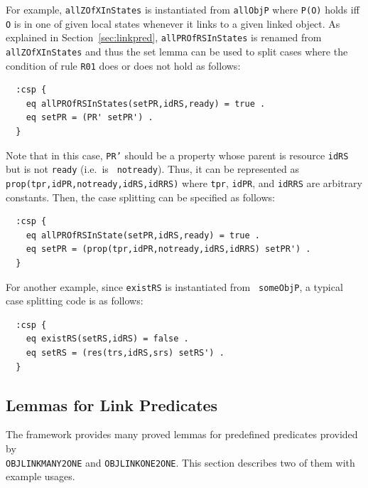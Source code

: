 \documentclass[12pt]{report}
\newcommand{\stt}[1]{{\small{\tt {#1}}}}
\begin{document}
For example, {\tt allZOfXInStates} is instantiated from {\tt allObjP}
where \stt{P(O)} holds iff {\tt O} is in one of given local
states whenever it links to a given linked object.  As explained in
Section~\ref{sec:linkpred}, {\tt allPROfRSInStates} is renamed
from {\tt allZOfXInStates} and thus the set lemma can be used to
split cases where the condition of rule {\tt R01} does or does not
hold as follows:
\small
\begin{verbatim}
  :csp {
    eq allPROfRSInStates(setPR,idRS,ready) = true .
    eq setPR = (PR' setPR') .
  }
\end{verbatim}
\normalsize
Note that in this case, {\tt PR'} should be a property whose parent is
resource {\tt idRS} but is not {\tt ready} (i.e.\ is {\tt
  notready}). Thus, it can be represented as
\stt{prop(tpr,idPR,notready,idRS,idRRS)} where {\tt tpr}, {\tt idPR},
and {\tt idRRS} are arbitrary constants. Then, the case splitting
can be specified as follows:
\small
\begin{verbatim}
  :csp {
    eq allPROfRSInState(setPR,idRS,ready) = true .
    eq setPR = (prop(tpr,idPR,notready,idRS,idRRS) setPR') .
  }
\end{verbatim}
\normalsize

For another example, since {\tt existRS} is instantiated from {\tt
  someObjP}, a typical case splitting code is as follows:
\small
\begin{verbatim}
  :csp {
    eq existRS(setRS,idRS) = false .
    eq setRS = (res(trs,idRS,srs) setRS') .
  }
\end{verbatim}
\normalsize

\subsection{Lemmas for Link Predicates}
\label{sec:linklemma}
The framework provides many proved lemmas for predefined predicates
provided by\\ {\tt OBJLINKMANY2ONE} and {\tt OBJLINKONE2ONE}. This
section describes two of them with example usages.
\end{document}
